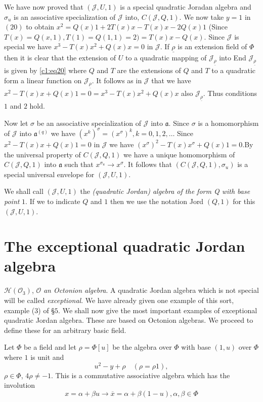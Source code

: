 We have now proved that $(\mathscr{J},U,1)$ is a special quadratic
Joradan algebra and $\sigma_u$ is an associative specialization of
$\mathscr{J}$ into, $C(\mathscr{J},Q,1)$. We now take $y=1$ in $(20)$
to obtain $x^{2}=Q(x)1+2T(x)x-T(x)x-2Q(x)1$ (Since
$T(x)=Q(x,1),T(1)=Q(1,1)=2)=T(x)x-Q(x)$. Since $\mathscr{J}$ is
special we have $x^{3}-T(x)x^{2}+Q(x)x=0$ in $\mathscr{J}$. If
$\underline{\rho}$ is an extension field of $\Phi$ then it is clear
that the extension of $U$ to a quadratic mapping of
$\mathscr{J}_{\underline{\rho}}$ into End
$\mathscr{J}_{\underline{\rho}}$ is given by \eqref{c1:eq20} where $Q$ and $T$
are the extensions of $Q$ and $T$ to a quadratic form a linear
function on $\mathscr{J}_{\underline{\rho}}$. It follows as in
$\mathscr{J}$ that we have $x^{2}-T(x)x+Q(x)1=0=x^{3}-T(x) x^{2}+Q(x)x$
also $\mathscr{J}_{\underline{\rho}}$. Thus conditions $1$ and $2$
hold.

Now let $\sigma$ be an associative specialization of $\mathscr{J}$
into $\mathfrak{a}$. Since $\sigma$ is a homomorphism of $\mathscr{J}$
into $\mathfrak{a}^{(q)}$ we have
$(x^{k})^{\sigma}=(x^{\sigma})^{k},k=0,1,2,\ldots$ Since
$x^{2}-T(x)x+Q(x)1=0$ in $\mathscr{J}$ we have
$(x^{\sigma})^{2}-T(x)x^{\sigma}+Q(x)1=0$.\pageoriginale By the
universal property 
of $C(\mathscr{J},Q,1)$ we have a unique homomorphism of
$C(\mathscr{J},Q, 1)$ into $\mathfrak{a}$ such that $x^{\sigma_u}\to
x^{\sigma}$. It follows that $(C(\mathscr{J},Q,1),\sigma_u)$ is a
special universal envelope for $(\mathscr{J},U,1)$.

We shall call $(\mathscr{J},U,1)$ the {\em (quadratic Jordan) algebra
  of the form Q with base point} $1$. If we to indicate $Q$ and $1$
then we use the notation Jord $(Q,1)$ for this $(\mathscr{J},U,1)$.

\section{The exceptional quadratic Jordan algebra}\label{c1:sec8}

$\mathscr{H}(\mathscr{O}_3)$, $\mathscr{O}$ {\em an Octonion
  algebra}. A quadratic Jordan algebra which is not special will be
called {\em exceptional}. We have already given one example of this
sort, example (3) of \S $5$. We shall now give the most important
examples of exceptional quadratic Jordan algebra. These are based on
Octonion algebras. We proceed to define these for an arbitrary basic
field.

Let $\Phi$ be a field and let $\rho=\Phi[u]$ be the algebra over
$\Phi$ with base $(1,u)$ over $\Phi$ where $1$ is unit and
\begin{equation*}
u^{2}-y+\rho\quad (\rho=\rho 1),\tag{23}\label{c1:eq23}
\end{equation*}
$\rho \in \Phi$, $4\rho \neq -1$. This is a commutative associative
algebra which has the involution 
\begin{equation*}
x=\alpha+\beta u\to \overline{x}=\alpha+\beta
(1-u),\alpha,\beta\in \Phi\tag{24}\label{c1:eq24}
\end{equation*}

